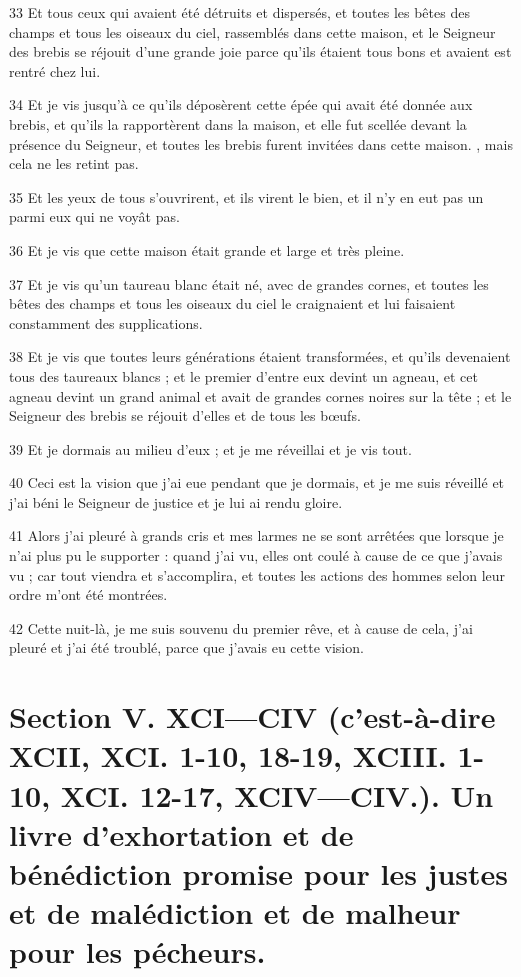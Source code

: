 \par 33 Et tous ceux qui avaient été détruits et dispersés, et toutes les bêtes des champs et tous les oiseaux du ciel, rassemblés dans cette maison, et le Seigneur des brebis se réjouit d'une grande joie parce qu'ils étaient tous bons et avaient est rentré chez lui.
\par 34 Et je vis jusqu'à ce qu'ils déposèrent cette épée qui avait été donnée aux brebis, et qu'ils la rapportèrent dans la maison, et elle fut scellée devant la présence du Seigneur, et toutes les brebis furent invitées dans cette maison. , mais cela ne les retint pas.
\par 35 Et les yeux de tous s'ouvrirent, et ils virent le bien, et il n'y en eut pas un parmi eux qui ne voyât pas.
\par 36 Et je vis que cette maison était grande et large et très pleine.
\par 37 Et je vis qu'un taureau blanc était né, avec de grandes cornes, et toutes les bêtes des champs et tous les oiseaux du ciel le craignaient et lui faisaient constamment des supplications.
\par 38 Et je vis que toutes leurs générations étaient transformées, et qu'ils devenaient tous des taureaux blancs ; et le premier d'entre eux devint un agneau, et cet agneau devint un grand animal et avait de grandes cornes noires sur la tête ; et le Seigneur des brebis se réjouit d'elles et de tous les bœufs.
\par 39 Et je dormais au milieu d'eux ; et je me réveillai et je vis tout.
\par 40 Ceci est la vision que j'ai eue pendant que je dormais, et je me suis réveillé et j'ai béni le Seigneur de justice et je lui ai rendu gloire.
\par 41 Alors j'ai pleuré à grands cris et mes larmes ne se sont arrêtées que lorsque je n'ai plus pu le supporter : quand j'ai vu, elles ont coulé à cause de ce que j'avais vu ; car tout viendra et s'accomplira, et toutes les actions des hommes selon leur ordre m'ont été montrées.
\par 42 Cette nuit-là, je me suis souvenu du premier rêve, et à cause de cela, j'ai pleuré et j'ai été troublé, parce que j'avais eu cette vision.

\part {Section V. XCI—CIV (c'est-à-dire XCII, XCI. 1-10, 18-19, XCIII. 1-10, XCI. 12-17, XCIV—CIV.). Un livre d'exhortation et de bénédiction promise pour les justes et de malédiction et de malheur pour les pécheurs.}

